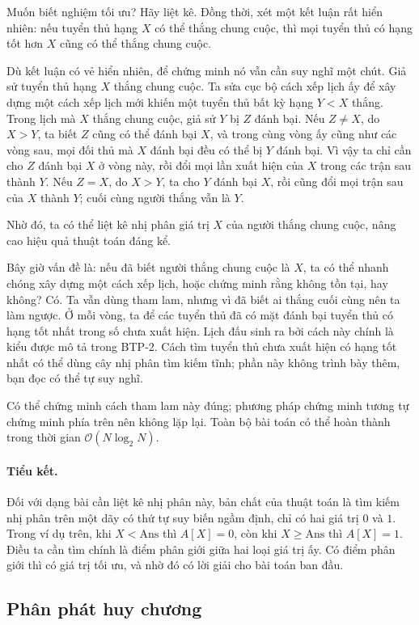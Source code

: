 \documentclass[11pt]{article}
\newcommand{\Oh}{\mathcal{O}}
\newcommand{\Ans}{\mathrm{Ans}}
\begin{document}
Muốn biết nghiệm tối ưu? Hãy liệt kê. Đồng thời, xét một kết luận rất hiển
nhiên: nếu tuyển thủ hạng $X$ có thể thắng chung cuộc, thì mọi tuyển thủ có
hạng tốt hơn $X$ cũng có thể thắng chung cuộc.

Dù kết luận có vẻ hiển nhiên, để chứng minh nó vẫn cần suy nghĩ một chút.
Giả sử tuyển thủ hạng $X$ thắng chung cuộc. Ta sửa cục bộ cách xếp lịch ấy để
xây dựng một cách xếp lịch mới khiến một tuyển thủ bất kỳ hạng $Y<X$ thắng.
Trong lịch mà $X$ thắng chung cuộc, giả sử $Y$ bị $Z$ đánh bại. Nếu $Z\ne X$,
do $X>Y$, ta biết $Z$ cũng có thể đánh bại $X$, và trong cùng vòng ấy cũng như
các vòng sau, mọi đối thủ mà $X$ đánh bại đều có thể bị $Y$ đánh bại. Vì vậy
ta chỉ cần cho $Z$ đánh bại $X$ ở vòng này, rồi đổi mọi lần xuất hiện của $X$
trong các trận sau thành $Y$. Nếu $Z=X$, do $X>Y$, ta cho $Y$ đánh bại $X$,
rồi cũng đổi mọi trận sau của $X$ thành $Y$; cuối cùng người thắng vẫn là
$Y$.

Nhờ đó, ta có thể liệt kê nhị phân giá trị $X$ của người thắng chung cuộc,
nâng cao hiệu quả thuật toán đáng kể.

Bây giờ vấn đề là: nếu đã biết người thắng chung cuộc là $X$, ta có thể nhanh
chóng xây dựng một cách xếp lịch, hoặc chứng minh rằng không tồn tại, hay
không? Có. Ta vẫn dùng tham lam, nhưng vì đã biết ai thắng cuối cùng nên ta
làm ngược. Ở mỗi vòng, ta để các tuyển thủ đã có mặt đánh bại tuyển thủ có
hạng tốt nhất trong số chưa xuất hiện. Lịch đấu sinh ra bởi cách này chính là
kiểu được mô tả trong BTP-2. Cách tìm tuyển thủ chưa xuất hiện có hạng tốt
nhất có thể dùng cây nhị phân tìm kiếm tĩnh; phần này không trình bày thêm,
bạn đọc có thể tự suy nghĩ.

Có thể chứng minh cách tham lam này đúng; phương pháp chứng minh tương tự
chứng minh phía trên nên không lặp lại. Toàn bộ bài toán có thể hoàn thành
trong thời gian $\Oh(N\log_2 N)$.

\paragraph{Tiểu kết.}
Đối với dạng bài cần liệt kê nhị phân này, bản chất của thuật toán là tìm kiếm
nhị phân trên một dãy có thứ tự suy biến ngầm định, chỉ có hai giá trị $0$ và
$1$. Trong ví dụ trên, khi $X<\Ans$ thì $A[X]=0$, còn khi $X\ge\Ans$ thì
$A[X]=1$. Điều ta cần tìm chính là điểm phân giới giữa hai loại giá trị ấy. Có
điểm phân giới thì có giá trị tối ưu, và nhờ đó có lời giải cho bài toán ban
đầu.

\subsection{Phân phát huy chương}
\end{document}
